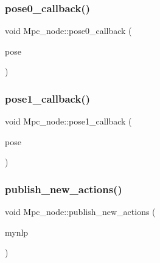 \subsubsection{\texorpdfstring{pose0\+\_\+callback()}{pose0\_callback()}}
{\footnotesize\ttfamily void Mpc\+\_\+node\+::pose0\+\_\+callback (\begin{DoxyParamCaption}\item[{geometry\+\_\+msgs\+::\+Pose\+With\+Covariance\+Stamped}]{pose }\end{DoxyParamCaption})}

\mbox{\label{classMpc__node_a4f389e33d9374ed2d18f58125035a0e4}} 
\subsubsection{\texorpdfstring{pose1\+\_\+callback()}{pose1\_callback()}}
{\footnotesize\ttfamily void Mpc\+\_\+node\+::pose1\+\_\+callback (\begin{DoxyParamCaption}\item[{geometry\+\_\+msgs\+::\+Pose\+With\+Covariance\+Stamped}]{pose }\end{DoxyParamCaption})}

\mbox{\label{classMpc__node_a97467f6ef0d64235da935823cfd4bd47}} 
\subsubsection{\texorpdfstring{publish\+\_\+new\+\_\+actions()}{publish\_new\_actions()}}
{\footnotesize\ttfamily void Mpc\+\_\+node\+::publish\+\_\+new\+\_\+actions (\begin{DoxyParamCaption}\item[{\hyperlink{classmyNLP}{my\+N\+LP} $\ast$}]{mynlp }\end{DoxyParamCaption})}

\mbox{\label{classMpc__node_a16734474d794c1896aebd9a008b96611}} 
